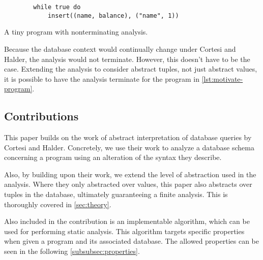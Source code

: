 \begin{listing}
    \begin{verbatim}
        while true do
            insert((name, balance), ("name", 1))
    \end{verbatim}
    \caption{A tiny program with nonterminating analysis.}
    \label{lst:motivate-program}
\end{listing}


Because the database context would continually change under Cortesi and Halder, the analysis would not terminate.
However, this doesn't have to be the case.
Extending the analysis to consider abstract tuples, not just abstract values, it is possible to have the analysis terminate for the program in \autoref{lst:motivate-program}.


\subsection{Contributions}\label{subsec:contributions}

This paper builds on the work of abstract interpretation of database queries by Cortesi and Halder.
Concretely, we use their work to analyze a database schema concerning a program using an alteration of the syntax they describe.


Also, by building upon their work, we extend the level of abstraction used in the analysis.
Where they only abstracted over values, this paper also abstracts over tuples in the database, ultimately guaranteeing a finite analysis.
This is thoroughly covered in \autoref{sec:theory}.


Also included in the contribution is an implementable algorithm, which can be used for performing static analysis.
This algorithm targets specific properties when given a program and its associated database.
The allowed properties can be seen in the following \autoref{subsubsec:properties}.

